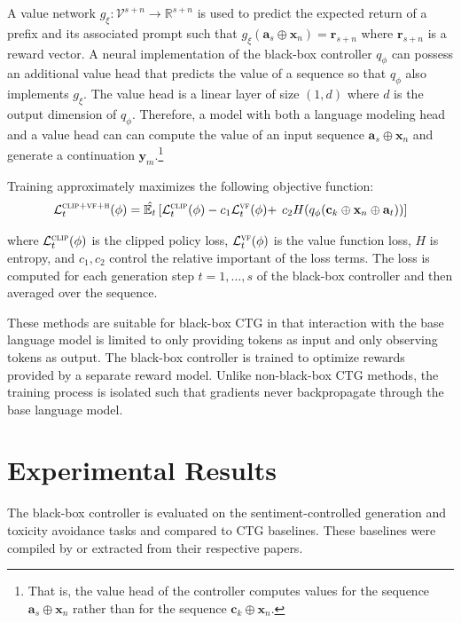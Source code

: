 \documentclass[phd,electronic,oneside,twosidetoc,letterpaper,chaptercenter,parttop,lof]{byumsphd}
\begin{document}
A value network \(g_\xi : \mathcal{V}^{s+n} \rightarrow \mathbb{R}^{s+n}\) is used to predict the expected return of a prefix and its associated prompt such that \(g_\xi(\mathbf{a}_s \oplus \mathbf{x}_n) = \mathbf{r}_{s+n}\) where \(\mathbf{r}_{s+n}\) is a reward vector.
A neural implementation of the black-box controller \(q_\phi\) can possess an additional value head that predicts the value of a sequence so that \(q_\phi\) also implements \(g_\xi\). The value head is a linear layer of size \((1, d)\) where \(d\) is the output dimension of \(q_\phi\)\citep{vonwerra2022trl}.
Therefore, a model with both a language modeling head and a value head can can compute the value of an input sequence \(\mathbf{a}_s \oplus \mathbf{x}_n\) and generate a continuation \(\mathbf{y}_m\).\footnote{That is, the value head of the controller computes values for the sequence $\mathbf{a}_s \oplus \mathbf{x}_n$  rather than for the sequence $\mathbf{c}_k \oplus \mathbf{x}_n$.}

Training approximately maximizes the following objective function:
\begin{align*}
    \mathcal{L}_t^{\textsc{clip}+\textsc{vf}+\textsc{h}} (\phi) = \hat{\mathbb{E}_t} \left[ \mathcal{L}_t^{\textsc{clip}} (\phi) - c_1 \mathcal{L}_t^{\textsc{vf}}(\phi) + \right.
    \left. c_2 H(q_\phi(\mathbf{c}_{k} \oplus \mathbf{x}_n \oplus \mathbf{a}_t)) \right]
\end{align*}

where \(\mathcal{L}_t^{\textsc{clip}}(\phi)\) is the clipped policy loss, \(\mathcal{L}_t^{\textsc{vf}}(\phi)\) is the value function loss, \(H\) is entropy, and \(c_1, c_2\) control the relative important of the loss terms.  The loss is computed for each generation step \(t = 1, \ldots, s\) of the black-box controller and then averaged over the sequence.

These methods are suitable for black-box CTG in that interaction with the base language model is limited to only providing tokens as input and only observing tokens as output. The black-box controller is trained to optimize rewards provided by a separate reward model. Unlike non-black-box CTG methods, the training process is isolated such that gradients never backpropagate through the base language model.

\section{Experimental Results}
\label{experiments}

The black-box controller is evaluated on the sentiment-controlled generation and toxicity avoidance tasks and compared to CTG baselines.
These baselines were compiled by \citet{liu2021dexpert} or extracted from their respective papers.
\end{document}
